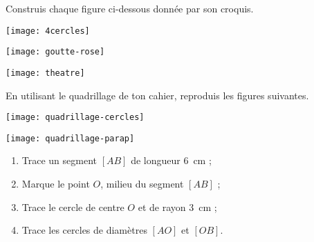 
\vspace*{3cm}

\phantom{coucou}

\pagebreak



\begin{exercice}
Construis chaque figure ci-dessous donnée par son croquis.
\begin{colenumerate}{2}
 \item
 
 \texttt{[image: 4cercles]}
 \item
 
\texttt{[image: goutte-rose]}
 \item
 
\texttt{[image: theatre]}
 \end{colenumerate}
\end{exercice}


\begin{exercice}
En utilisant le quadrillage de ton cahier, reproduis les figures suivantes.
\begin{colenumerate}{2}
 \item
 
 \texttt{[image: quadrillage-cercles]}
 \item
 
\texttt{[image: quadrillage-parap]}

 \end{colenumerate}
\end{exercice}


\begin{exercice}[À construire]
\begin{enumerate}
 \item Trace un segment $[AB]$ de longueur 6 cm ;
 \item Marque le point $O$, milieu du segment $[AB]$ ;
 \item Trace le cercle de centre $O$ et de rayon 3 cm ;
 \item Trace les cercles de diamètres $[AO]$ et $[OB]$.
 \end{enumerate}
\end{exercice}



\columnbreak


